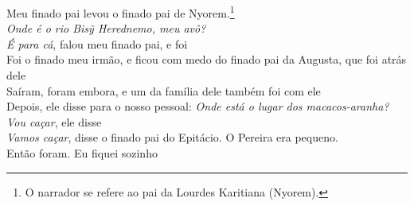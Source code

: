 \bigskip

\begin{linenumbers}\begingroup\raggedright
 
\noindent   Meu finado pai levou o finado pai de Nyorem.\footnote{O narrador se refere ao pai da Lourdes Karitiana (Nyorem).}\\
  \emph{Onde é o rio \emph{Bisỹ Herednemo}, meu avô?}\\
  \emph{É para cá}, falou meu finado pai, e foi\\
  Foi o finado meu irmão, e ficou com medo do finado pai da Augusta, que foi atrás dele\\
  Saíram, foram embora, e um da família dele também foi com ele\\
  Depois, ele disse para o nosso pessoal: \emph{Onde está o lugar dos macacos-aranha?}\\
  \emph{Vou caçar}, ele disse\\
  \emph{Vamos caçar}, disse o finado pai do Epitácio. O Pereira era pequeno.\\
  Então foram. Eu fiquei sozinho
 
\end{linenumbers}\endgroup

\bigskip

